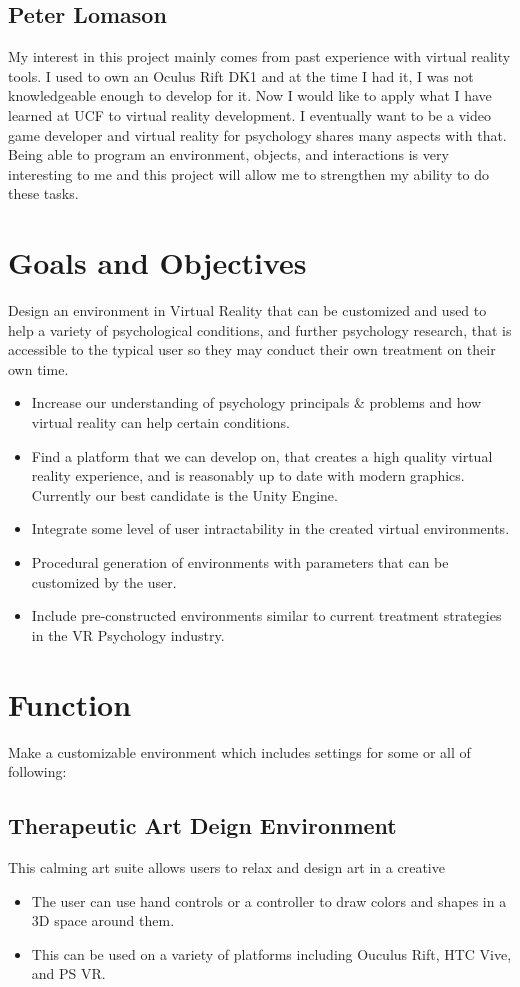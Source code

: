 \documentclass[a4paper,10pt]{article}
\begin{document}
	\subsection{Peter Lomason}
	My interest in this project mainly comes from past experience with virtual reality tools. I used to own an Oculus Rift DK1 and at the time I had it, 
	I was not knowledgeable enough to develop for it. Now I would like to apply what I have learned at UCF to virtual reality development. I eventually want to be
	a video game developer and virtual reality for psychology shares many aspects with that. Being able to program an environment, objects, and interactions is very
	interesting to me and this project will allow me to strengthen my ability to do these tasks.
	\pagebreak
	\section{Goals and Objectives}
	Design an environment in Virtual Reality that can be customized and used to help a variety of psychological conditions, and further psychology research, that is accessible to the typical user so they may conduct their own treatment on their own time.
	\begin{itemize}
		\item Increase our understanding of psychology principals \& problems and how virtual reality can help certain conditions.
		\item Find a platform that we can develop on, that creates a high quality virtual reality experience, and is reasonably up to date with modern graphics. Currently our best candidate is the Unity Engine.
		\item Integrate some level of user intractability in the created virtual environments. 
		\item Procedural generation of environments with parameters that can be customized by the user. 
		\item Include pre-constructed environments similar to current treatment strategies in the VR Psychology industry.
	\end{itemize}
	
	\section{Function}
	Make a customizable environment which includes settings for some or all of following:
	\subsection{Therapeutic Art Deign Environment}
	This calming art suite allows users to relax and design art in a creative 
	\begin{itemize}
		\item The user can use hand controls or a controller to draw colors and shapes in a 3D space around them. 
		\item This can be used on a variety of platforms including Ouculus Rift, HTC Vive, and PS VR.
	\end{itemize}   
\end{document}
